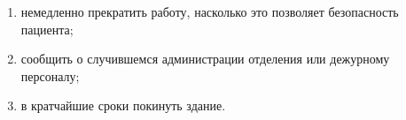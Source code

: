 \documentclass[a4paper,14pt]{extarticle}
\begin{document}
\begin{enumerate}
\begin{enumerate}
\item немедленно прекратить работу, насколько это позволяет безопасность пациента;
\item сообщить о случившемся администрации отделения или дежурному персоналу;
\item в кратчайшие сроки покинуть здание.
\end{enumerate}
                                                                                                                                                                                                                                                                                                                                                                                                                                                                                                                                                                                                                                                                                                                                                                                                                                                                                                                                                                                                                                                                                                                                                                                                                                                                                                                                                                                                                                                                                                                                                                                                                                                                                                                                                                                                                                                                                                                                                                                                                                                                                                                                                                                                                                                                                                                                                                                                                                                                                                                                                                                                                                                                                                                                                                                                                                                                                                                                                         
\end{enumerate}
\end{document}
